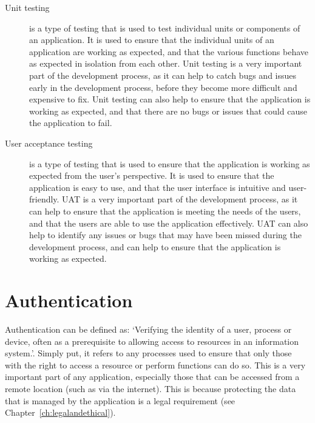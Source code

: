 \documentclass[11pt, a4paper,twoside]{report}
\theoremstyle{plain} %
\theoremstyle{definition} %
\numberwithin{equation}{chapter}
\begin{document}
\begin{description}
    \item[Unit testing\cite{unit-testing}] {
        is a type of testing that is used to test individual units or
        components of an application. It is used to ensure that the individual
        units of an application are working as expected, and that the various
        functions behave as expected in isolation from each other. Unit testing
        is a very important part of the development process, as it can help to
        catch bugs and issues early in the development process, before they
        become more difficult and expensive to fix. Unit testing can also help
        to ensure that the application is working as expected, and that there
        are no bugs or issues that could cause the application to fail.
        }
    \item[User acceptance testing\cite{user-testing}] {
        is a type of testing that is used to ensure that the application is
        working as expected from the user's perspective. It is used to ensure
        that the application is easy to use, and that the user interface is
        intuitive and user-friendly. UAT is a very important part of the
        development process, as it can help to ensure that the application is
        meeting the needs of the users, and that the users are able to use the
        application effectively. UAT can also help to identify any issues or
        bugs that may have been missed during the development process, and can
        help to ensure that the application is working as expected.
        }
\end{description}


\section{Authentication}\label{sec:backgroundauthentication}

Authentication can be defined as: `Verifying the identity of a user, process or
device, often as a prerequisite to allowing access to resources in an
information system.'\cite{authentication}. Simply put, it refers to any
processes used to ensure that only those with the right to access a resource or
perform functions can do so. This is a very important part of any application,
especially those that can be accessed from a remote location (such as via the
internet). This is because protecting the data that is managed by the
application is a legal requirement (see Chapter~\ref{ch:legalandethical}).
\end{document}
